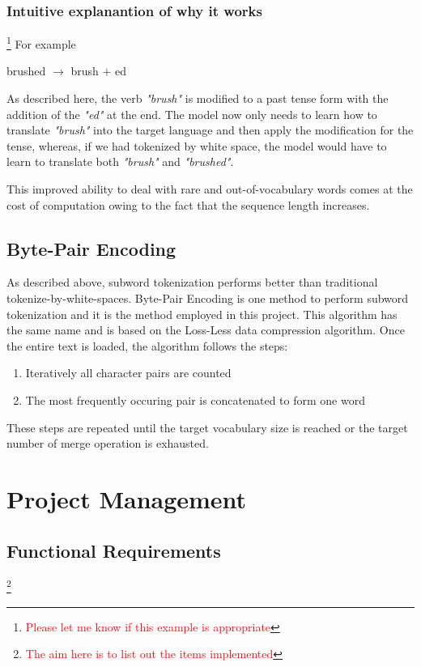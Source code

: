 \documentclass[12pt,a4paper,twoside,openright]{report}
\newcommand{\red}[1]{\textcolor{red}{#1}}
\newcommand{\changedFont}[1]{{\fontfamily{qcr}\selectfont #1}}
\begin{document}
\subsubsection{Intuitive explanantion of why it works}\footnote{\red{Please let me know if this example is appropriate}}
For example \\
\begin{center}
    \changedFont{brushed} $\longrightarrow$ \changedFont{brush $+$ ed}
\end{center}
As described here, the verb \textit{"brush"} is modified to a past tense form with the addition of the \textit{"ed"} at the end. The model now only needs to learn how to translate \textit{"brush"} into the target language and then apply the modification for the tense, whereas, if we had tokenized by white space, the model would have to learn to translate both \textit{"brush"} and \textit{"brushed"}.

This improved ability to deal with rare and out-of-vocabulary words comes at the cost of computation owing to the fact that the sequence length increases. 

\subsection{Byte-Pair Encoding}
\label{bpe}
As described above, subword tokenization performs better than traditional tokenize-by-white-spaces. Byte-Pair Encoding is one method to perform subword tokenization and it is the method employed in this project. This algorithm has the same name and is based on the Loss-Less data compression algorithm. Once the entire text is loaded, the algorithm follows the steps: 
\begin{enumerate}
    \item Iteratively all character pairs are counted
    \item The most frequently occuring pair is concatenated to form one word
\end{enumerate}
These steps are repeated until the target vocabulary size is reached or the target number of merge operation is exhausted. 

\section{Project Management}
\label{project-management}


\subsection{Functional Requirements}\footnote{\red{The aim here is to list out the items implemented}}
\label{functional-requirements}
\end{document}
